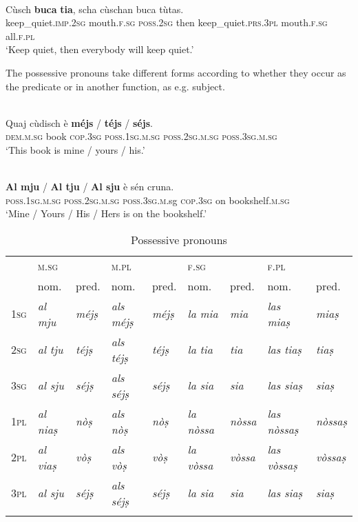 \ea
{}\\
\gll Cùsch \textbf{buca} \textbf{tia}, scha cùschan buca tùtas.\\
keep\_quiet.\textsc{imp.2sg} mouth.\textsc{f.sg} \textsc{poss.2sg} then keep\_quiet.\textsc{prs.3pl} mouth.\textsc{f.sg} all.\textsc{f.pl}\\
\glt `Keep quiet, then everybody will keep quiet.'
\z

The possessive pronouns take different forms according to whether they occur as the predicate or in another function, as e.g. subject.

\ea
{}\\
\gll Quaj cùdisch è \textbf{méjs} / \textbf{téjs} / \textbf{séjs}.\\
\textsc{dem.m.sg} book \textsc{cop.3sg} \textsc{poss.1sg.m.sg} {} \textsc{poss.2sg.m.sg} {} \textsc{poss.3sg.m.sg} \\
\glt `This book is mine / yours / his.'
\z

\ea

\\
\gll \textbf{Al mju} / \textbf{Al tju} / \textbf{Al sju} è sén cruna.\\
\textsc{poss.1sg.m.sg} {} \textsc{poss.2sg.m.sg} {} \textsc{poss.3sg.m}.sg \textsc{cop.3sg} on bookshelf.\textsc{m.sg}   \\
\glt `Mine / Yours / His / Hers is on the bookshelf.'
\z


\begin{table}
	\caption{Possessive pronouns}
	\label{posspron}
	\begin{tabular}{lllllllll}
		\lsptoprule
		& \textsc{m.sg} && \textsc{m.pl}  && \textsc{f.sg}  && \textsc{f.pl}\\
		& nom. & pred. & nom. & pred. & nom. & pred. & nom. & pred.\\
		\midrule
		\textsc{1sg}  & \textit{al mju}  & \textit{méjṣ} & \textit{als méjṣ} & \textit{méjṣ} & \textit{la mia} & \textit{mia} & \textit{las miaṣ} & \textit{miaṣ}\\
		\textsc{2sg} & \textit{al tju} & \textit{téjṣ} & \textit{als téjṣ} &\textit{téjṣ} & \textit{la tia} & \textit{tia} & \textit{las tiaṣ} & \textit{tiaṣ}\\
		\textsc{3sg} & \textit{al sju} & \textit{séjṣ} & \textit{als séjṣ}& \textit{séjṣ} & \textit{la sia} & \textit{sia} & \textit{las siaṣ} & \textit{siaṣ}\\
		\textsc{1pl} & \textit{al niaṣ} & \textit{nòṣ} & \textit{als nòṣ} & \textit{nòṣ}  & \textit{la nòssa} & \textit{nòssa} & \textit{las nòssaṣ} & \textit{nòssaṣ}\\
		\textsc{2pl} & \textit{al viaṣ}  & \textit{vòṣ} & \textit{als vòṣ} & \textit{vòṣ} & \textit{la vòssa} & \textit{vòssa} & \textit{las vòssaṣ} & \textit{vòssaṣ}\\
		\textsc{3pl} & \textit{al sju} & \textit{séjṣ} & \textit{als séjṣ} & \textit{séjṣ} & \textit{la sia} & \textit{sia} & \textit{las siaṣ} & \textit{siaṣ}\\
		\lspbottomrule
	\end{tabular}
\end{table}

